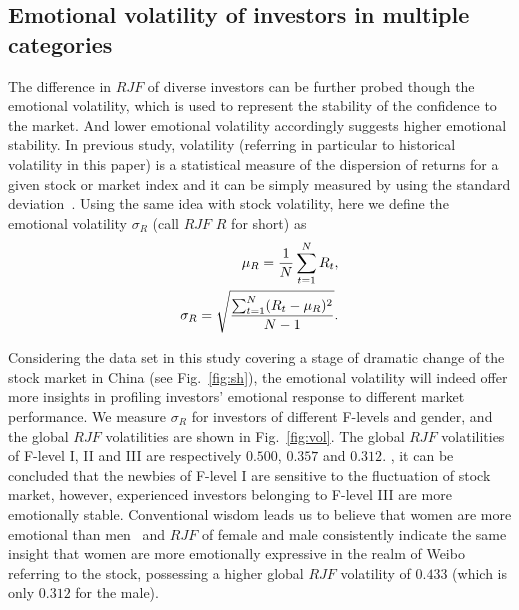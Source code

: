 \documentclass[aps,preprint,groupedaddress]{revtex4-1}
\begin{document}
\subsection{Emotional volatility of investors in multiple categories}
The difference in $RJF$ of diverse investors can be further probed though the emotional volatility, which is used to represent the stability of the confidence to the market. And lower emotional volatility accordingly suggests higher emotional stability. In previous study, volatility (referring in particular to historical volatility in this paper) is a statistical measure of the dispersion of returns for a given stock or market index and it can be simply measured by using the standard deviation~\cite{Schwert1989Why}. Using the same idea with stock volatility, here we define the emotional volatility $\sigma_{R}$ (call $RJF$ $R$ for short) as
\begin{gather}
\centering
\begin{split}
 \mu_{R} = \frac{1}{N}\sum_{t=1}^{N}R_{t}, \\
 \sigma_{R} = \sqrt{\frac{\sum_{t=1}^{N}(R_{t} - \mu_{R})^2}{N-1}}.
\end{split}
\end{gather}

Considering the data set in this study covering a stage of dramatic change of the stock market in China (see Fig.~\ref{fig:sh}), the emotional volatility will indeed offer more insights in profiling investors' emotional response to different market performance. We measure $\sigma_{R}$ for investors of different F-levels and gender, and the global $RJF$ volatilities are shown in Fig.~\ref{fig:vol}. The global $RJF$ volatilities of F-level I, II and III are respectively $0.500$, $0.357$ and $0.312$. {\color{black}{Accordingly}}, it can be concluded that the newbies of F-level I are sensitive to the fluctuation of stock market, however, experienced investors belonging to F-level III are more emotionally stable. Conventional wisdom leads us to believe that women are more emotional than men~\cite{parkins2012gender,deng2016gender} and $RJF$ of female and male consistently indicate the same insight that women are more emotionally expressive in the realm of Weibo referring to the stock, possessing a higher global $RJF$ volatility of $0.433$ (which is only $0.312$ for the male).
\end{document}
